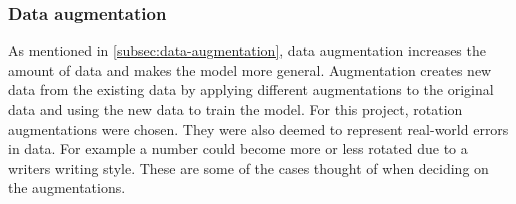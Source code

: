\subsubsection{Data augmentation}
As mentioned in \autoref{subsec:data-augmentation}, data augmentation increases the amount of data and makes the model more general. Augmentation creates new data from the existing data by applying different augmentations to the original data and using the new data to train the model. For this project, rotation augmentations were chosen. They were also deemed to represent real-world errors in data. For example a number could become more or less rotated due to a writers writing style. These are some of the cases thought of when deciding on the augmentations.
